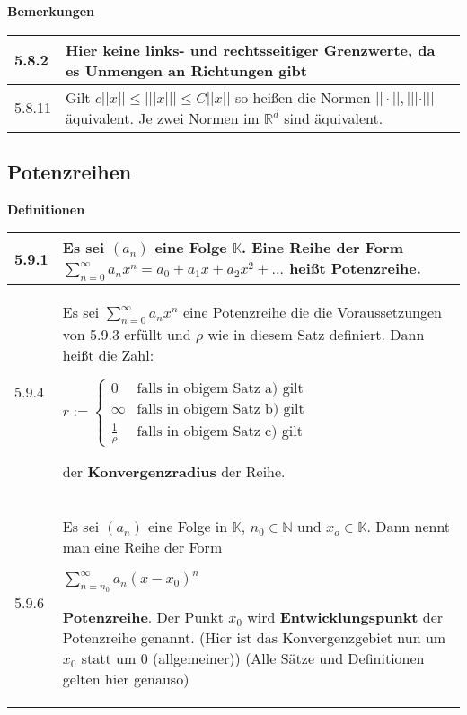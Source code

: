     \noindent
    \textbf{Bemerkungen}
    
    \begin{longtable}{p{1cm} p{16cm}}
        \toprule

        5.8.2 & Hier keine links- und rechtsseitiger Grenzwerte, da es Unmengen an Richtungen gibt \\
        \midrule
        5.8.11& Gilt $c||x|| \leq |||x||| \leq C||x||$ so hei\ss en die Normen $||\cdot||,|||\cdot|||$ äquivalent. \hfill \break
                Je zwei Normen im $\mathbb{R}^d$ sind äquivalent. \\

        \bottomrule
    \end{longtable}
    

    

\subsection{Potenzreihen}
    \noindent
    \textbf{Definitionen}
      
    \begin{longtable}{p{1cm} p{16cm}}
        \toprule

        5.9.1 & Es sei $(a_n)$ eine Folge $\mathbb{K}$. Eine Reihe der Form $\sum^{\infty}_{n=0} a_n x^n = a_0 + a_1x+a_2x^2+ \dots$ 
                heißt \textbf{Potenzreihe}. \\
        \midrule
        5.9.4 & Es sei $\sum^{\infty}_{n=0} a_nx^n$ eine Potenzreihe die die Voraussetzungen von 5.9.3 erfüllt und $\rho$ wie in diesem Satz 
                definiert. Dann heißt die Zahl: \hfill \break
                \centerline{$r:=    \begin{cases}
                                    0 & \text{falls in obigem Satz a) gilt} \\
                                    \infty & \text{falls in obigem Satz b) gilt} \\
                                    \frac{1}{\rho} & \text{falls in obigem Satz c) gilt}
                                    \end{cases}$ }
                der \textbf{Konvergenzradius} der Reihe. \\
        \midrule
        5.9.6 & Es sei $(a_n)$ eine Folge in $\mathbb{K}$, $n_0 \in \mathbb{N}$ und $x_o \in \mathbb{K}$. Dann nennt man eine Reihe der Form \hfill \break
                \centerline{$\sum^{\infty}_{n=n_0}a_n(x-x_0)^n$}
                \textbf{Potenzreihe}. Der Punkt $x_0$ wird \textbf{Entwicklungspunkt} der Potenzreihe genannt. \hfill \break
                (Hier ist das Konvergenzgebiet nun um $x_0$ statt um 0 (allgemeiner)) \hfill \break
                (Alle Sätze und Definitionen gelten hier genauso) \\

        \bottomrule

    \end{longtable}
    

